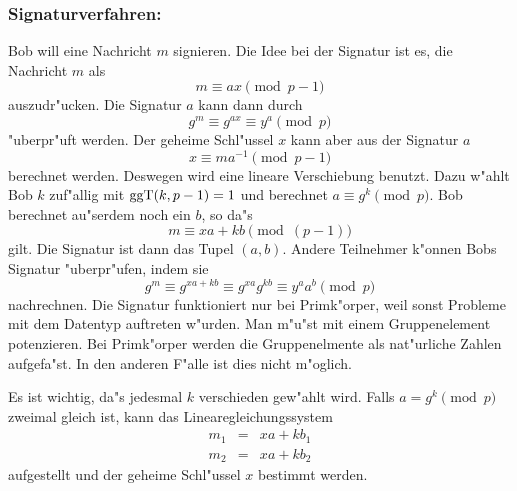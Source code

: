      \subsubsection*{\bf Signaturverfahren:}
       Bob will eine Nachricht $m$ signieren. Die Idee bei der Signatur 
       ist es, die Nachricht $m$ als
       $$ m \equiv a x \pmod{p-1}$$
       auszudr"ucken. Die Signatur $a$ kann dann durch
       $$ g^{m} \equiv g^{a x} \equiv y^{a} \pmod{p}$$
       "uberpr"uft werden. Der geheime Schl"ussel $x$ kann aber aus der Signatur $a$
       $$ x \equiv m a^{-1} \pmod{p-1} $$
       berechnet werden. Deswegen wird eine lineare Verschiebung benutzt. Dazu 
       w"ahlt Bob $k$ zuf"allig mit $\mbox{ggT}(k,p-1)=1$ und berechnet 
       $a \equiv g^k \pmod{p}$. Bob berechnet au"serdem noch ein $b$, so da"s
       $$ m \equiv x a + k b \pmod{(p-1)} $$
       gilt. Die Signatur ist dann das Tupel $(a,b)$. Andere Teilnehmer k"onnen 
       Bobs Signatur "uberpr"ufen, indem sie
       $$ g^m \equiv g^{x a + k b} \equiv g^{x a} g^{k b} \equiv y^a a^b \pmod{p} $$
       nachrechnen. Die Signatur funktioniert nur bei Primk"orper,
       weil sonst Probleme mit dem Datentyp auftreten w"urden. Man m"u"st mit einem 
       Gruppenelement potenzieren. Bei Primk"orper werden die Gruppenelmente 
       als nat"urliche Zahlen aufgefa"st. In den anderen F"alle ist dies nicht
       m"oglich.

       Es ist wichtig, da"s jedesmal $k$ verschieden gew"ahlt wird. Falls 
       $a=g^{k} \pmod{p}$ zweimal gleich ist, kann das Linearegleichungssystem
       \begin{eqnarray*}
         m_1 & = & x a + k b_1 \\
         m_2 & = & x a + k b_2 
       \end{eqnarray*}
       aufgestellt und der geheime Schl"ussel $x$ bestimmt werden.
     
